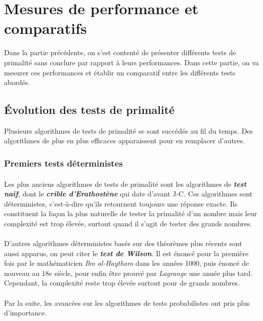 \section{Mesures de performance et comparatifs}
	Dans la partie précédente, on s'est contenté de présenter différents tests de primalité sans conclure par rapport à leurs performances. Dans cette partie, on va mesurer ces performances et établir un comparatif entre les différents tests abordés.
	
	\subsection{Évolution des tests de primalité}
		Plusieurs algorithmes de tests de primalité se sont succédés au fil du temps. Des algorithmes de plus en plus efficaces apparaissent pour en remplacer d'autres.
	
		\subsubsection*{Premiers tests déterministes}
			\paragraph{}Les plus anciens algorithmes de tests de primalité sont les algorithmes de \textit{\textbf{test naïf}}, dont le \textit{\textbf{crible d'Erathostène}} qui date d'avant J-C. Ces algorithmes sont déterministes, c'est-à-dire qu'ils retournent toujours une réponse exacte. Ils constituent la façon la plus naturelle de tester la primalité d'un nombre mais leur complexité est trop élevée, surtout quand il s'agit de tester des grands nombres.
			
			\paragraph{}D'autres algorithmes déterministes basés sur des théorèmes plus récents sont aussi apparus, on peut citer le \textit{\textbf{test de Wilson}}. Il est énoncé pour la première fois par le mathématicien \textit{Ibn al-Haytham} dans les années 1000, puis énoncé de nouveau au 18e siècle, pour enfin être prouvé par \textit{Lagrange} une année plus tard. Cependant, la complexité reste trop élevée surtout pour de grands nombres.
			
			\paragraph{} Par la suite, les avancées sur les algorithmes de tests probabilistes ont pris plus d'importance.
		
